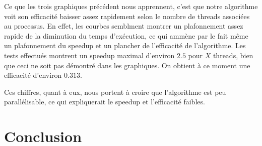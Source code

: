 \documentclass{report}
\begin{document}
Ce que les trois graphiques précédent nous apprennent, c'est que notre algorithme voit son efficacité baisser assez rapidement selon le nombre de threads associées au processus. En effet, les courbes semblment montrer un plafonnement assez rapide de la diminution du temps d'exécution, ce qui ammène par le fait même un plafonnement du speedup et un plancher de l'efficacité de l'algorithme. Les tests effectués montrent un speedup maximal d'environ $2.5$ pour $X$ threads, bien que ceci ne soit pas démontré dans les graphiques. On obtient à ce moment une efficacité d'environ $0.313$. 

\bigskip Ces chiffres, quant à eux, nous portent à croire que l'algorithme est peu parallélisable, ce qui expliquerait le speedup et l'efficacité faibles.

\chapter{Conclusion}
\end{document}
